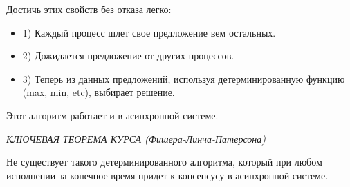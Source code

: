 \begin{remark}
Достичь этих свойств без отказа легко:
    \begin{itemize}
        \item 1) Каждый процесс шлет свое предложение вем остальных.
        \item 2) Дожидается предложение от других процессов.
        \item 3) Теперь из данных предложений, используя детерминированную функцию (max, min, etc), выбирает решение.
    \end{itemize}
\end{remark}
 
Этот алгоритм работает и в асинхронной системе.
 
\begin{theorem}
    \textit{КЛЮЧЕВАЯ ТЕОРЕМА КУРСА (Фишера-Линча-Патерсона)}
 
    Не существует такого детерминированного алгоритма, который при любом исполнении за конечное время придет к консенсусу в асинхронной системе.
\end{theorem}
